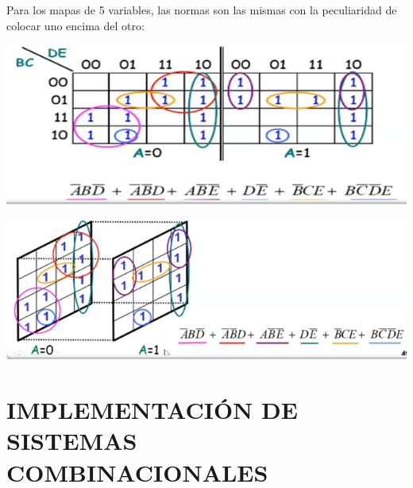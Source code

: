 \documentclass[a4paper,10pt]{book}
\begin{document}
Para los mapas de 5 variables, las normas son las mismas con la peculiaridad de colocar uno encima del otro:

\begin{center}
\includegraphics[scale=0.95]{mapas 6}
\end{center}

\begin{center}
\includegraphics[scale=0.95]{mapas 7}
\end{center}


\chapter*{IMPLEMENTACIÓN DE SISTEMAS COMBINACIONALES}
\end{document}
